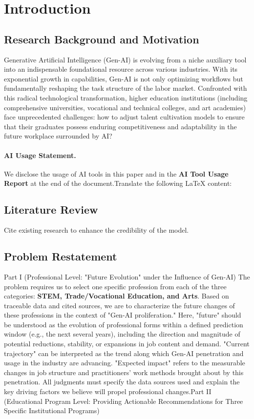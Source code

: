 \section{Introduction}\subsection{Research Background and Motivation}Generative Artificial Intelligence (Gen-AI) is evolving from a niche auxiliary tool into an indispensable foundational resource across various industries. With its exponential growth in capabilities, Gen-AI is not only optimizing workflows but fundamentally reshaping the task structure of the labor market. Confronted with this radical technological transformation, higher education institutions (including comprehensive universities, vocational and technical colleges, and art academies) face unprecedented challenges: how to adjust talent cultivation models to ensure that their graduates possess enduring competitiveness and adaptability in the future workplace surrounded by AI?\paragraph{AI Usage Statement.} We disclose the usage of AI tools in this paper and in the \textbf{AI Tool Usage Report} at the end of the document.Translate the following LaTeX content:\subsection{Literature Review}Cite existing research to enhance the credibility of the model. \cite{freyosborne2017}\subsection{Problem Restatement}Part I (Professional Level: "Future Evolution" under the Influence of Gen-AI)  
The problem requires us to select one specific profession from each of the three categories: \textbf{STEM, Trade/Vocational Education, and Arts}. Based on traceable data and cited sources, we are to characterize the future changes of these professions in the context of "Gen-AI proliferation." Here, "future" should be understood as the evolution of professional forms within a defined prediction window (e.g., the next several years), including the direction and magnitude of potential reductions, stability, or expansions in job content and demand. "Current trajectory" can be interpreted as the trend along which Gen-AI penetration and usage in the industry are advancing. "Expected impact" refers to the measurable changes in job structure and practitioners' work methods brought about by this penetration. All judgments must specify the data sources used and explain the key driving factors we believe will propel professional changes.Part II (Educational Program Level: Providing Actionable Recommendations for Three Specific Institutional Programs)  

